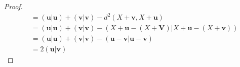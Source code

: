 \documentclass[main.tex]{subfiles}
\begin{document}
\begin{proof}
\begin{align*}
                                                          & =\left(\mathbf{u}|\mathbf{u}\right)+\left(\mathbf{v}|\mathbf{v}\right)-d^2\left(X+\mathbf{v},X+\mathbf{u}\right)                                                                               \\
                                                          & =\left(\mathbf{u}|\mathbf{u}\right)+\left(\mathbf{v}|\mathbf{v}\right)-\left(X+\mathbf{u}-\left(X+\mathbf{V}\right)|X+\mathbf{u}-\left(X+\mathbf{v}\right)\right)                              \\
                                                          & =\left(\mathbf{u}|\mathbf{u}\right)+\left(\mathbf{v}|\mathbf{v}\right)-\left(\mathbf{u}-\mathbf{v}|\mathbf{u}-\mathbf{v}\right)                                                                \\
                                                          & =2\left(\mathbf{u}|\mathbf{v}\right)
    \end{align*}
\end{proof}
\end{document}
